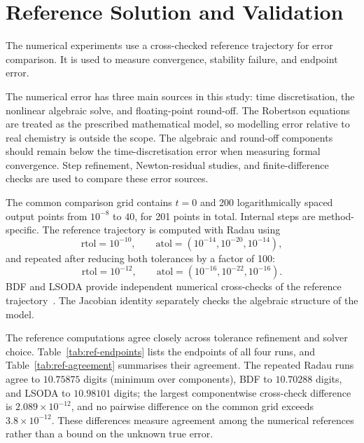 \section{Reference Solution and Validation}
The numerical experiments use a cross-checked reference trajectory for error comparison. It is used to measure convergence, stability failure, and endpoint error.

The numerical error has three main sources in this study: time discretisation, the nonlinear algebraic solve, and floating-point round-off. The Robertson equations are treated as the prescribed mathematical model, so modelling error relative to real chemistry is outside the scope. The algebraic and round-off components should remain below the time-discretisation error when measuring formal convergence. Step refinement, Newton-residual studies, and finite-difference checks are used to compare these error sources.

The common comparison grid contains $t=0$ and 200 logarithmically spaced output points from $10^{-8}$ to $40$, for 201 points in total. Internal steps are method-specific. The reference trajectory is computed with Radau using
\[
\mathrm{rtol}=10^{-10},\qquad
\mathrm{atol}=(10^{-14},10^{-20},10^{-14}),
\]
and repeated after reducing both tolerances by a factor of 100:
\[
\mathrm{rtol}=10^{-12},\qquad
\mathrm{atol}=(10^{-16},10^{-22},10^{-16}).
\]
BDF and LSODA provide independent numerical cross-checks of the reference trajectory~\cite{scipy}. The Jacobian identity separately checks the algebraic structure of the model.

The reference computations agree closely across tolerance refinement and solver choice. Table~\ref{tab:ref-endpoints} lists the endpoints of all four runs, and Table~\ref{tab:ref-agreement} summarises their agreement. The repeated Radau runs agree to $10.75875$ digits (minimum over components), BDF to $10.70288$ digits, and LSODA to $10.98101$ digits; the largest componentwise cross-check difference is $2.089\times10^{-12}$, and no pairwise difference on the common grid exceeds $3.8\times10^{-12}$. These differences measure agreement among the numerical references rather than a bound on the unknown true error.

